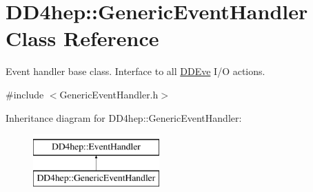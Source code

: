\hypertarget{class_d_d4hep_1_1_generic_event_handler}{}\section{D\+D4hep\+:\+:Generic\+Event\+Handler Class Reference}
\label{class_d_d4hep_1_1_generic_event_handler}


Event handler base class. Interface to all \hyperlink{struct_d_d4hep_1_1_d_d_eve}{D\+D\+Eve} I/O actions.  




{\ttfamily \#include $<$Generic\+Event\+Handler.\+h$>$}

Inheritance diagram for D\+D4hep\+:\+:Generic\+Event\+Handler\+:\begin{figure}[H]
\begin{center}
\leavevmode
\includegraphics[height=2.000000cm]{class_d_d4hep_1_1_generic_event_handler}
\end{center}
\end{figure}
